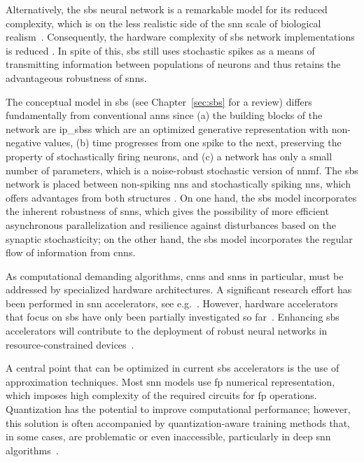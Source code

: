	Alternatively, the \gls{sbs} neural network is a remarkable model for its reduced complexity, which is on the less realistic side of the \gls{snn} scale of biological realism~\cite{rotermund2019Backpropagation,ernst2007efficient}. Consequently, the hardware complexity of \gls{sbs} network implementations is reduced
	\cite{nevarez2020accelerator,rotermund2018massively}. In spite of this, \gls{sbs} still uses stochastic spikes as a means of transmitting information between populations of neurons and thus retains the advantageous robustness of \glspl{snn}.


The conceptual model in \gls{sbs} (see Chapter~\ref{sec:sbs} for a review) differs fundamentally from conventional \glspl{ann} since (a) the building blocks of the network are \glspl{ip_sbs} which are an optimized generative representation with non-negative values, (b) time progresses from one spike to the next, preserving the property of stochastically firing neurons, and (c) a network has only a small number of parameters, which is a noise-robust stochastic version of \gls{nnmf}. The \gls{sbs} network is placed between non-spiking \glspl{nn} and stochastically spiking \glspl{nn}, which offers advantages from both structures \cite{rotermund2019Backpropagation}. On one hand, the \gls{sbs} model incorporates the inherent robustness of \glspl{snn}, which gives the possibility of more efficient asynchronous parallelization and resilience against disturbances based on the synaptic stochasticity; on the other hand, the \gls{sbs} model incorporates the regular flow of information from \glspl{cnn}.  


As computational demanding algorithms, \glspl{cnn} and \glspl{snn} in particular, must be addressed by specialized hardware architectures. A significant research effort has been performed in \gls{snn} accelerators, see e.g.~\cite{roy2019towards,bouvier2019spiking, young2019review,TrueNorth_Trans15,Spinnaker_Trans13,davies2018loihi}.
  However, hardware accelerators that focus on \gls{sbs} have only been partially investigated so far~\cite{rotermund2018massively}.
  Enhancing \gls{sbs} accelerators will contribute to the deployment of robust neural networks in resource-constrained devices~\cite{nevarez2020accelerator,ernst2007efficient,rotermund2019recurrentsbs, dayan2001theoretical}.

A central point that can be optimized in current \gls{sbs} accelerators
is the use of approximation techniques.
Most \gls{snn} models use \gls{fp}  numerical representation, which imposes high complexity of the required circuits for \gls{fp} operations. Quantization has the potential to improve computational performance; however, this solution is often accompanied by quantization-aware training methods that, in some cases, are problematic or even inaccessible, particularly in deep \gls{snn} algorithms~\cite{zhang2018survey}.

